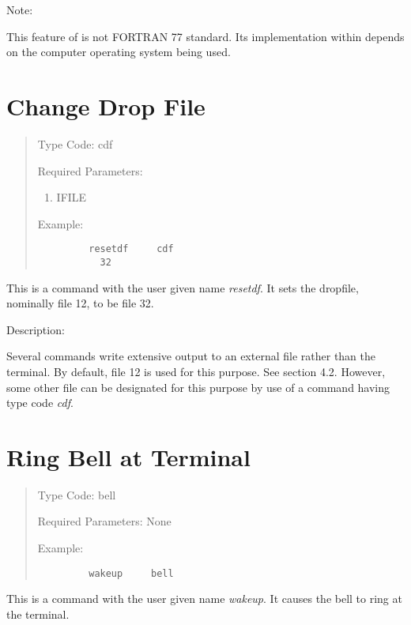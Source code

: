 \vspace{5mm}
Note:
\vspace{2mm}

This feature of \Mary is not FORTRAN 77 standard.  Its implementation
within \Mary depends on the computer operating system being used.

\newpage
\section{Change Drop File}
\begin{quotation}
\noindent Type Code:  cdf
\vspace{5mm}

\noindent Required Parameters:
\begin{enumerate}
      \item  IFILE
\end{enumerate}

\vspace{5mm}
\noindent Example:
\begin{verbatim}
         resetdf     cdf
           32
\end{verbatim}
\end{quotation}
This is a command with the user given name {\em resetdf}.  It sets
the dropfile, nominally file 12, to be file 32.

\vspace{5mm}
     Description:
\vspace{2mm}

Several \Mary commands write extensive output to an external file rather
than the terminal.  By default, file 12 is used for this purpose.  See
section 4.2.  However, some other file can be designated for this purpose
by use of a command having type code {\em cdf}.

\newpage
\section{Ring Bell at Terminal}
\begin{quotation}
\noindent Type Code:  bell
\vspace{5mm}

\noindent Required Parameters:  None

\vspace{5mm}
\noindent Example:
\begin{verbatim}
         wakeup     bell
\end{verbatim}
\end{quotation}
This is a command with the user given name {\em wakeup}.  It causes
the bell to ring at the terminal.

